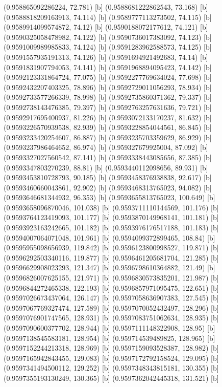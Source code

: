 {{{(0.958865092286224, 72.781) [b] 
(0.9588681222862543, 73.168) [b] 
(0.9588818209163913, 74.114) [b] 
(0.9589777113273502, 74.115) [b] 
(0.9589914099574872, 74.12) [b] 
(0.9590188072177612, 74.121) [b] 
(0.9590325058478982, 74.122) [b] 
(0.9590736017383092, 74.123) [b] 
(0.9591009989985833, 74.124) [b] 
(0.9591283962588573, 74.125) [b] 
(0.9591557935191313, 74.126) [b] 
(0.9591694921492683, 74.14) [b] 
(0.9591831907794053, 74.141) [b] 
(0.9591968894095423, 74.142) [b] 
(0.9592123331864724, 77.075) [b] 
(0.9592277769634024, 77.698) [b] 
(0.9592432207403325, 78.896) [b] 
(0.9592729011056293, 78.934) [b] 
(0.9592733577266339, 78.998) [b] 
(0.9592735860371362, 79.337) [b] 
(0.9592738143476385, 79.397) [b] 
(0.9592763257631636, 79.721) [b] 
(0.9592917695400937, 81.226) [b] 
(0.9593072133170237, 81.632) [b] 
(0.9593226570939538, 82.939) [b] 
(0.9593228854044561, 86.845) [b] 
(0.9593233420254607, 86.887) [b] 
(0.9593235703359629, 86.929) [b] 
(0.9593237986464652, 86.974) [b] 
(0.959327679925004, 87.092) [b] 
(0.9593327027560542, 87.141) [b] 
(0.9593338443085656, 87.385) [b] 
(0.9593347803270239, 88.81) [b] 
(0.9593440112098656, 89.931) [b] 
(0.9593453810728793, 90.185) [b] 
(0.9593458376938838, 92.617) [b] 
(0.9593460660043861, 92.902) [b] 
(0.9593468313765023, 94.082) [b] 
(0.9593646681344932, 96.353) [b] 
(0.9593655813765023, 100.649) [b] 
(0.9593658096870046, 101.038) [b] 
(0.9593711110144569, 101.176) [b] 
(0.9593764123419093, 101.177) [b] 
(0.9593870149968141, 101.181) [b] 
(0.9593923163242665, 101.182) [b] 
(0.9593976176517188, 101.183) [b] 
(0.9594007064071048, 101.961) [b] 
(0.9594099372899465, 108.84) [b] 
(0.9595955098656939, 119.842) [b] 
(0.9596123800998527, 119.871) [b] 
(0.9596292503340116, 119.877) [b] 
(0.9596461205681704, 121.285) [b] 
(0.9596629908023293, 121.347) [b] 
(0.9596798610364882, 121.49) [b] 
(0.9596826007625155, 121.971) [b] 
(0.9596830573835201, 121.987) [b] 
(0.9596844272465338, 122.193) [b] 
(0.9596857971095475, 122.651) [b] 
(0.9597026673437064, 126.147) [b] 
(0.9597058636907383, 127.545) [b] 
(0.9597067769327474, 127.589) [b] 
(0.9597070052432497, 128.296) [b] 
(0.9597076901747565, 128.931) [b] 
(0.9597083751062634, 128.935) [b] 
(0.9597090600377702, 128.944) [b] 
(0.9597111148322908, 128.95) [b] 
(0.9597138545583181, 128.954) [b] 
(0.959714539489825, 128.965) [b] 
(0.9597152244213318, 128.969) [b] 
(0.9597159093528387, 128.982) [b] 
(0.9597165942843455, 129.083) [b] 
(0.9597172792158524, 129.095) [b] 
(0.9597341494500112, 129.252) [b] 
(0.9597348343815181, 130.355) [b] 
(0.9597355193130249, 130.365) [b] 
(0.9597362042445318, 131.521) [b] 
}}}
